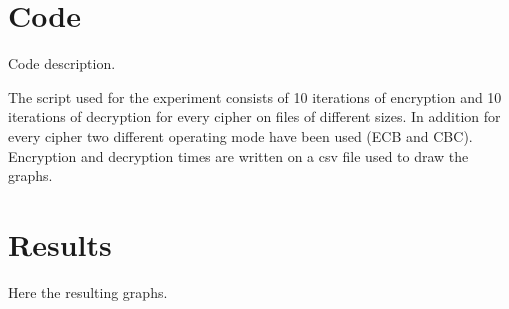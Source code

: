 \documentclass[11pt,a4paper]{article}
\begin{document}
\section{Code}
Code description.

The script used for the experiment consists of 10 iterations of encryption and 10 iterations of decryption for every cipher on files of different sizes. In addition for every cipher two different operating mode have been used (ECB and CBC).
Encryption and decryption times are written on a csv file used to draw the graphs.

\clearpage
\section{Results}
Here the resulting graphs.
\end{document}
